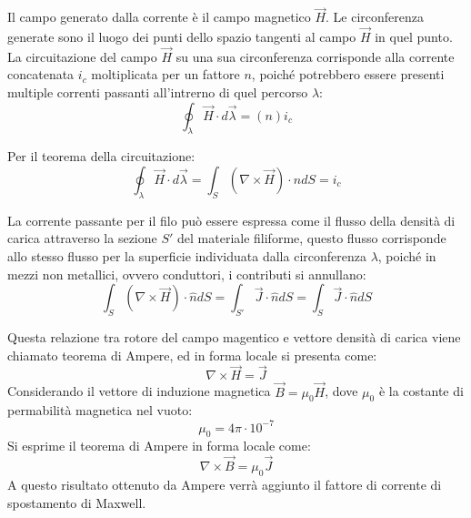 \documentclass{article}
\numberwithin{equation}{subsection}
\begin{document}
Il campo generato dalla corrente è il campo magnetico $\vec{H}$. Le circonferenza generate sono il luogo dei punti dello spazio tangenti al campo $\vec{H}$ 
in quel punto. La circuitazione del campo $\vec{H}$ su una sua circonferenza corrisponde alla corrente concatenata $i_c$ moltiplicata per un fattore $n$, poiché potrebbero essere presenti multiple 
correnti passanti all'intrerno di quel percorso $\lambda$: 
\begin{equation*}
    \displaystyle\oint_{\lambda}\vec{H}\cdot d\vec{\lambda}=(n)i_c
\end{equation*}

Per il teorema della circuitazione:
\begin{equation*}
    \displaystyle\oint_{\lambda}\vec{H}\cdot d\vec{\lambda}=\int_S(\nabla\times\vec{H})\cdot\hat{n}dS=i_c
\end{equation*}

La corrente passante per il filo può essere espressa come il flusso della densità di carica attraverso la sezione $S'$ del materiale filiforme, questo flusso corrisponde allo 
stesso flusso per la superficie individuata dalla circonferenza $\lambda$, poiché in mezzi non metallici, ovvero conduttori, i contributi si annullano:
\begin{equation}
    \displaystyle\int_S(\nabla\times\vec{H})\cdot\hat{n}dS=\int_{S'}\vec{J}\cdot\hat{n}dS=\int_S\vec{J}\cdot\hat{n}dS
\end{equation}

\begin{center}
\end{center}

Questa relazione tra rotore del campo magentico e vettore densità di carica viene chiamato teorema di Ampere, ed in forma locale si presenta come:
\begin{equation*}
    \nabla\times\vec{H}=\vec{J}
\end{equation*}
Considerando il vettore di induzione magnetica $\vec{B}=\mu_0\vec{H}$, dove $\mu_0$ è la costante di permabilità magnetica nel vuoto:
\begin{equation*}
    \mu_0=4\pi\cdot10^{-7}
\end{equation*}
Si esprime il teorema di Ampere in forma locale come:
\begin{equation}
    \nabla\times\vec{B}=\mu_0\vec{J}
\end{equation}
A questo risultato ottenuto da Ampere verrà aggiunto il fattore di corrente di spostamento di Maxwell. 
\end{document}
